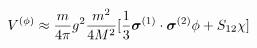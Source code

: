 \begin{equation}
V^{(\phi)} \approx \frac{m}{4 \pi} g^{2} \frac{m^{2}}{4M^{2}}
[\frac{1}{3} \mbox{\boldmath $\sigma$}^{(1)} \cdot \mbox{\boldmath $\sigma$}^{(2)} \phi + S_{12} \chi]  \label{eq:hm}
\end{equation}

